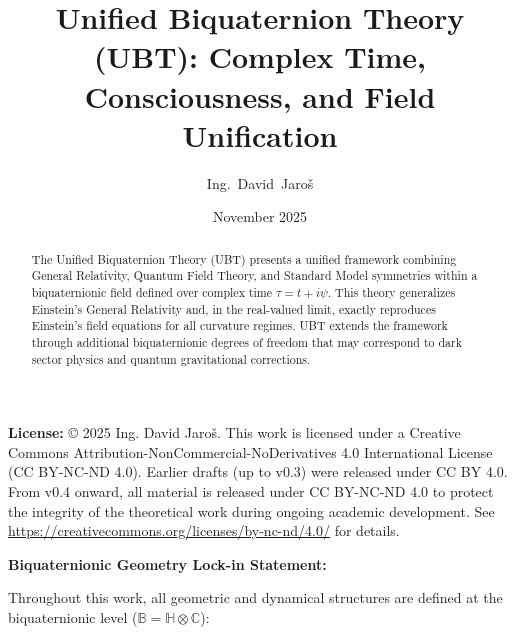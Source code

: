 \documentclass[12pt]{article}
\title{Unified Biquaternion Theory (UBT): Complex Time, Consciousness, and Field Unification}
\author{Ing.~David~Jaroš}
\date{November 2025}
\begin{document}
\maketitle

\noindent
\textbf{License:} © 2025 Ing. David Jaroš. This work is licensed under a Creative Commons Attribution-NonCommercial-NoDerivatives 4.0 International License (CC BY-NC-ND 4.0). Earlier drafts (up to v0.3) were released under CC BY 4.0. From v0.4 onward, all material is released under CC BY-NC-ND 4.0 to protect the integrity of the theoretical work during ongoing academic development. See \url{https://creativecommons.org/licenses/by-nc-nd/4.0/} for details.

\vspace{1em}

\begin{abstract}
The Unified Biquaternion Theory (UBT) presents a unified framework combining General Relativity, Quantum Field Theory, and Standard Model symmetries within a biquaternionic field defined over complex time $\tau = t + i\psi$. This theory generalizes Einstein's General Relativity and, in the real-valued limit, exactly reproduces Einstein's field equations for all curvature regimes. UBT extends the framework through additional biquaternionic degrees of freedom that may correspond to dark sector physics and quantum gravitational corrections.
\end{abstract}

\noindent\textbf{Biquaternionic Geometry Lock-in Statement:}

Throughout this work, all geometric and dynamical structures are defined at the biquaternionic level ($\mathbb{B} = \mathbb{H} \otimes \mathbb{C}$):
\end{document}
